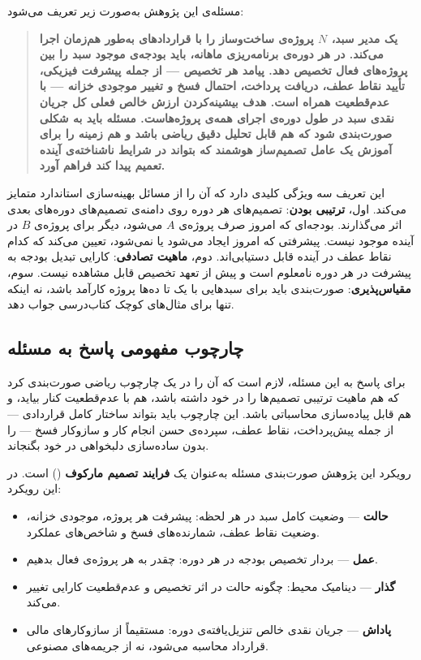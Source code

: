 مسئله‌ی این پژوهش به‌صورت زیر تعریف می‌شود:

\begin{quote}
\textbf{یک مدیر سبد، $N$ پروژه‌ی ساخت‌وساز را با قراردادهای
 به‌طور هم‌زمان اجرا می‌کند. در هر دوره‌ی برنامه‌ریزی
ماهانه، باید بودجه‌ی موجود سبد را بین پروژه‌های فعال تخصیص دهد.
پیامد هر تخصیص — از جمله پیشرفت فیزیکی، تأیید نقاط عطف، دریافت
پرداخت، احتمال فسخ و تغییر موجودی خزانه — با عدم‌قطعیت همراه است.
هدف بیشینه‌کردن ارزش خالص فعلی کل جریان نقدی سبد در طول دوره‌ی
اجرای همه‌ی پروژه‌هاست. مسئله باید به شکلی صورت‌بندی شود که هم
قابل تحلیل دقیق ریاضی باشد و هم زمینه را برای آموزش یک عامل
تصمیم‌ساز هوشمند که بتواند در شرایط ناشناخته‌ی آینده تعمیم پیدا کند
فراهم آورد.}
\end{quote}

این تعریف سه ویژگی کلیدی دارد که آن را از مسائل بهینه‌سازی استاندارد
متمایز می‌کند. اول، \textbf{ترتیبی بودن}: تصمیم‌های هر دوره روی دامنه‌ی
تصمیم‌های دوره‌های بعدی اثر می‌گذارند. بودجه‌ای که امروز صرف پروژه‌ی $A$
می‌شود، دیگر برای پروژه‌ی $B$ در آینده موجود نیست. پیشرفتی که امروز ایجاد
می‌شود یا نمی‌شود، تعیین می‌کند که کدام نقاط عطف در آینده قابل دستیابی‌اند.
دوم، \textbf{ماهیت تصادفی}: کارایی تبدیل بودجه به پیشرفت در هر دوره
نامعلوم است و پیش از تعهد تخصیص قابل مشاهده نیست. سوم، \textbf{مقیاس‌پذیری}:
صورت‌بندی باید برای سبدهایی با یک تا ده‌ها پروژه کارآمد باشد، نه اینکه
تنها برای مثال‌های کوچک کتاب‌درسی جواب دهد.

\subsection{چارچوب مفهومی پاسخ به مسئله}

برای پاسخ به این مسئله، لازم است که آن را در یک چارچوب ریاضی
صورت‌بندی کرد که هم ماهیت ترتیبی تصمیم‌ها را در خود داشته باشد، هم
با عدم‌قطعیت کنار بیاید، و هم قابل پیاده‌سازی محاسباتی باشد. این
چارچوب باید بتواند ساختار کامل قراردادی  — از جمله پیش‌پرداخت،
نقاط عطف، سپرده‌ی حسن انجام کار و سازوکار فسخ — را بدون ساده‌سازی
دلبخواهی در خود بگنجاند.

رویکرد این پژوهش صورت‌بندی مسئله به‌عنوان یک \textbf{فرایند تصمیم
مارکوف} () است. در این رویکرد:
\begin{itemize}[nosep]
  \item \textbf{حالت} — وضعیت کامل سبد در هر لحظه: پیشرفت هر پروژه،
    موجودی خزانه، وضعیت نقاط عطف، شمارنده‌های فسخ و شاخص‌های عملکرد.
  \item \textbf{عمل} — بردار تخصیص بودجه در هر دوره: چقدر به هر پروژه‌ی
    فعال بدهیم.
  \item \textbf{گذار} — دینامیک محیط: چگونه حالت در اثر تخصیص و
    عدم‌قطعیت کارایی تغییر می‌کند.
  \item \textbf{پاداش} — جریان نقدی خالص تنزیل‌یافته‌ی دوره: مستقیماً
    از سازوکارهای مالی قرارداد محاسبه می‌شود، نه از جریمه‌های مصنوعی.
\end{itemize}

